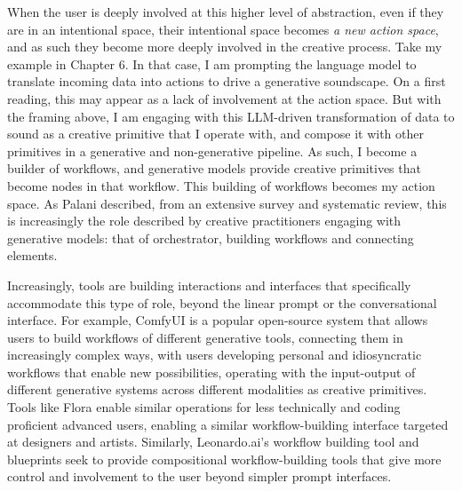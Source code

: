 When the user is deeply involved at this higher level of abstraction, even if they are in an intentional space, their intentional space becomes \textit{a new action space}, and as such they become more deeply involved in the creative process. Take my example in Chapter 6. In that case, I am prompting the language model to translate incoming data into actions to drive a generative soundscape. On a first reading, this may appear as a lack of involvement at the action space. But with the framing above, I am engaging with this LLM-driven transformation of data to sound as a creative primitive that I operate with, and compose it with other primitives in a generative and non-generative pipeline. As such, I become a builder of workflows, and generative models provide creative primitives that become nodes in that workflow. This building of workflows becomes my action space. As Palani described, from an extensive survey and systematic review, this is increasingly the role described by creative practitioners engaging with generative models: that of orchestrator, building workflows and connecting elements.

Increasingly, tools are building interactions and interfaces that specifically accommodate this type of role, beyond the linear prompt or the conversational interface. For example, ComfyUI is a popular open-source system that allows users to build workflows of different generative tools, connecting them in increasingly complex ways, with users developing personal and idiosyncratic workflows that enable new possibilities, operating with the input-output of different generative systems across different modalities as creative primitives. Tools like Flora enable similar operations for less technically and coding proficient advanced users, enabling a similar workflow-building interface targeted at designers and artists. Similarly, Leonardo.ai's workflow building tool and blueprints seek to provide compositional workflow-building tools that give more control and involvement to the user beyond simpler prompt interfaces.

